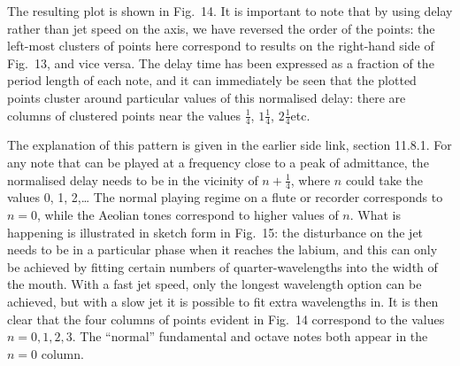   The resulting plot is shown in Fig.\ 14. It is important to note that by 
  using delay rather than jet speed on the axis, we have reversed the order of 
  the points: the left-most clusters of points here correspond to results on 
  the right-hand side of Fig.\ 13, and vice versa. The delay time has been 
  expressed as a fraction of the period length of each note, and it can 
  immediately be seen that the plotted points cluster around particular values 
  of this normalised delay: there are columns of clustered points near the 
  values $\frac{1}{4}$, $1 \frac{1}{4}$, $2 \frac{1}{4}$etc. 


  The explanation of this pattern is given in the earlier side link, section 
  11.8.1. For any note that can be played at a frequency close to a peak of 
  admittance, the normalised delay needs to be in the vicinity of 
  $n+\frac{1}{4}$, where $n$ could take the values 0, 1, 2,… The normal playing 
  regime on a flute or recorder corresponds to $n=0$, while the Aeolian tones 
  correspond to higher values of $n$. What is happening is illustrated in 
  sketch form in Fig.\ 15: the disturbance on the jet needs to be in a 
  particular phase when it reaches the labium, and this can only be achieved by 
  fitting certain numbers of quarter-wavelengths into the width of the mouth. 
  With a fast jet speed, only the longest wavelength option can be achieved, 
  but with a slow jet it is possible to fit extra wavelengths in. It is then 
  clear that the four columns of points evident in Fig.\ 14 correspond to the 
  values $n=0,1,2,3$. The ``normal'' fundamental and octave notes both appear 
  in the $n=0$ column. 


